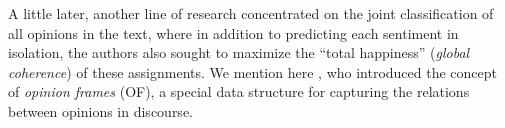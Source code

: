 A little later, another line of research
concentrated on the joint classification of all opinions in the text,
where in addition to predicting each sentiment in isolation, the
authors also sought to maximize the ``total happiness'' (\emph{global
  coherence}) of these assignments. We mention here 
, who introduced
the concept of \emph{opinion frames} (OF), a special data structure
for capturing the relations between opinions in discourse.  
